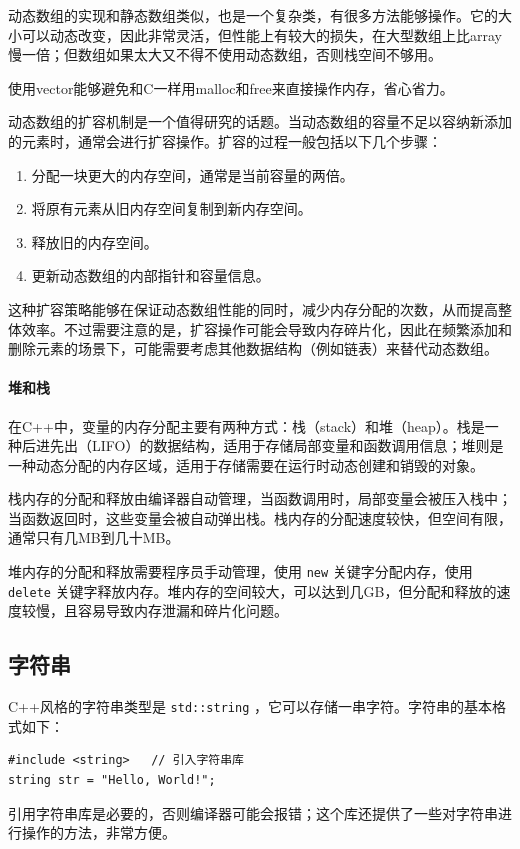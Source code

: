 动态数组的实现和静态数组类似，也是一个复杂类，有很多方法能够操作。它的大小可以动态改变，因此非常灵活，但性能上有较大的损失，在大型数组上比array慢一倍；但数组如果太大又不得不使用动态数组，否则栈空间不够用。

使用vector能够避免和C一样用malloc和free来直接操作内存，省心省力。

动态数组的扩容机制是一个值得研究的话题。当动态数组的容量不足以容纳新添加的元素时，通常会进行扩容操作。扩容的过程一般包括以下几个步骤：
\begin{enumerate}
  \item 分配一块更大的内存空间，通常是当前容量的两倍。
  \item 将原有元素从旧内存空间复制到新内存空间。
  \item 释放旧的内存空间。
  \item 更新动态数组的内部指针和容量信息。
\end{enumerate}
这种扩容策略能够在保证动态数组性能的同时，减少内存分配的次数，从而提高整体效率。不过需要注意的是，扩容操作可能会导致内存碎片化，因此在频繁添加和删除元素的场景下，可能需要考虑其他数据结构（例如链表）来替代动态数组。

\paragraph{堆和栈}

在C++中，变量的内存分配主要有两种方式：栈（stack）和堆（heap）。栈是一种后进先出（LIFO）的数据结构，适用于存储局部变量和函数调用信息；堆则是一种动态分配的内存区域，适用于存储需要在运行时动态创建和销毁的对象。

栈内存的分配和释放由编译器自动管理，当函数调用时，局部变量会被压入栈中；当函数返回时，这些变量会被自动弹出栈。栈内存的分配速度较快，但空间有限，通常只有几MB到几十MB。

堆内存的分配和释放需要程序员手动管理，使用 \texttt{new} 关键字分配内存，使用 \texttt{delete} 关键字释放内存。堆内存的空间较大，可以达到几GB，但分配和释放的速度较慢，且容易导致内存泄漏和碎片化问题。

\subsection{字符串}
C++风格的字符串类型是 \texttt{std::string} ，它可以存储一串字符。字符串的基本格式如下：
\begin{verbatim}
#include <string>   // 引入字符串库
string str = "Hello, World!";
\end{verbatim}
引用字符串库是必要的，否则编译器可能会报错；这个库还提供了一些对字符串进行操作的方法，非常方便。


